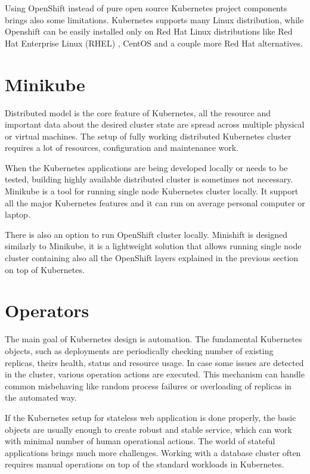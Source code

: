 \documentclass[
  digital, %
  twoside, %
  table,   %
  lof,     %
  lot,     %
]{fithesis3}
\begin{document}
Using OpenShift instead of pure open source Kubernetes project components brings also some limitations. Kubernetes supports many Linux distribution, while Openshift can be easily installed only on Red Hat Linux distributions like Red Hat Enterprise Linux (RHEL) \cite{rhel}, CentOS \cite{centos} and a couple more Red Hat alternatives.

\section{Minikube} \label{sec:minikube}
Distributed model is the core feature of Kubernetes, all the resource and important data about the desired cluster state are spread across multiple physical or virtual machines. The setup of fully working distributed Kubernetes cluster requires a lot of resources, configuration and maintenance work.

When the Kubernetes applications are being developed locally or needs to be tested, building highly available distributed cluster is sometimes not necessary. Minikube \cite{minikube} is a tool for running single node Kubernetes cluster locally. It support all the major Kubernetes features and it can run on average personal computer or laptop.

There is also an option to run OpenShift cluster locally. Minishift \cite{minishift} is designed similarly to Minikube, it is a lightweight solution that allows running single node cluster containing also all the OpenShift layers explained in the previous section on top of Kubernetes.

\section{Operators} \label{sec:operators}
The main goal of Kubernetes design is automation. The fundamental Kubernetes objects, such as deployments are periodically checking number of existing replicas, theirs health, status and resource usage. In case some issues are detected in the cluster, various operation actions are executed. This mechanism can handle common misbehaving like random process failures or overloading of replicas in the automated way.

If the Kubernetes setup for stateless web application is done properly, the basic objects are usually enough to create robust and stable service, which can work with minimal number of human operational actions. The world of stateful applications brings much more challenges. Working with a database cluster often requires manual operations on top of the standard workloads in Kubernetes.
\end{document}
